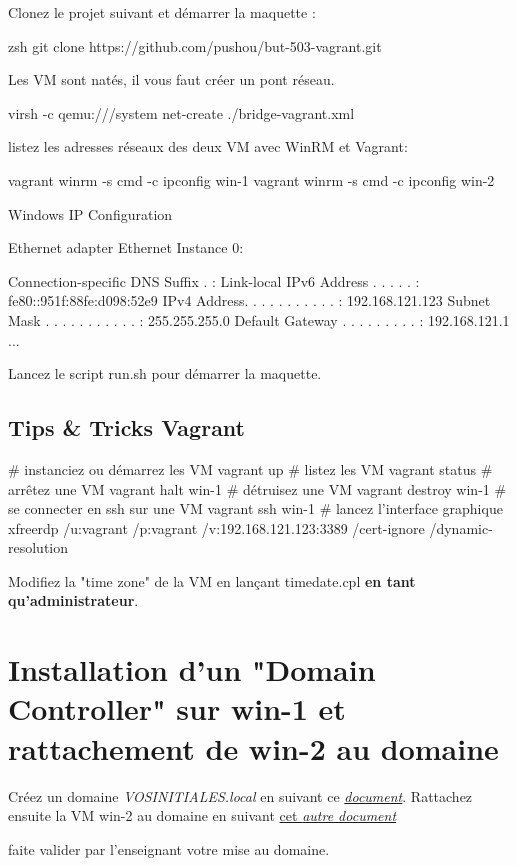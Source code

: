 Clonez le projet suivant et démarrer la maquette : 
\begin{bashcode}
zsh
git clone https://github.com/pushou/but-503-vagrant.git
\end{bashcode}

Les VM sont natés, il vous faut créer un pont réseau.
\begin{bashcode}
virsh -c qemu:///system net-create ./bridge-vagrant.xml
\end{bashcode}


listez les adresses réseaux des deux VM avec WinRM et Vagrant:
\begin{bashcode}
vagrant winrm -s cmd -c ipconfig win-1
vagrant winrm -s cmd -c ipconfig win-2

    Windows IP Configuration
    
    
    Ethernet adapter Ethernet Instance 0:
    
       Connection-specific DNS Suffix  . :
       Link-local IPv6 Address . . . . . : fe80::951f:88fe:d098:52e9%
       IPv4 Address. . . . . . . . . . . : 192.168.121.123
       Subnet Mask . . . . . . . . . . . : 255.255.255.0
       Default Gateway . . . . . . . . . : 192.168.121.1
...
\end{bashcode}

Lancez le script run.sh pour démarrer la maquette.

\subsection{Tips \& Tricks Vagrant}

\begin{bashcode}
# instanciez ou démarrez les VM
vagrant up 
# listez les VM
vagrant status    
# arrêtez une VM
vagrant halt win-1
# détruisez une VM 
vagrant destroy win-1
# se connecter en ssh sur une VM
vagrant ssh win-1
# lancez l'interface graphique 
xfreerdp  /u:vagrant /p:vagrant /v:192.168.121.123:3389  /cert-ignore  /dynamic-resolution
\end{bashcode}


Modifiez la "time zone" de la VM en lançant timedate.cpl  \textbf{en tant qu'administrateur}.

\section{Installation d'un "Domain Controller" sur win-1 et rattachement de win-2 au domaine}

Créez un domaine \textit{VOSINITIALES.local} en suivant ce 
\href{https://github.com/pushou/pushou_public_pdf/blob/main/BUT/R5.cyber.11/installation_ad_en_images.pdf}{\emph{document}}.
Rattachez ensuite la VM win-2 au domaine en suivant \href{https://github.com/pushou/pushou_public_pdf/blob/main/BUT/R5.cyber.11/join_domain_en_images.pdf}
{cet \emph{autre document}}

faite valider par l'enseignant votre mise au domaine.



